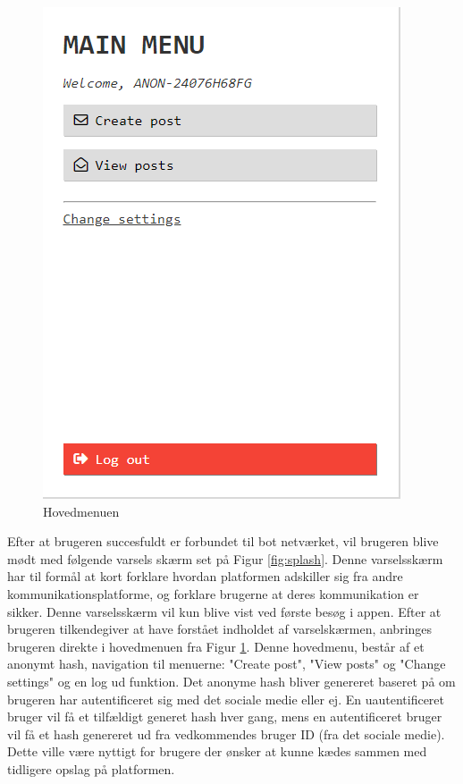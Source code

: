 \begin{table}[H]
\begin{minipage}{.5\textwidth}
\begin{figure}[H]
            \includegraphics[width=0.90\linewidth]{Projectdoc/Assets/Illustrationer/main-menu.png}
            \caption{Hovedmenuen}
            \label{fig:mainmenu}
        \end{figure}
    \end{minipage}
\end{table}

Efter at brugeren succesfuldt er forbundet til bot netværket, vil brugeren blive mødt med følgende varsels skærm set på Figur \ref{fig:splash}. Denne varselsskærm har til formål at kort forklare hvordan platformen adskiller sig fra andre kommunikationsplatforme, og forklare brugerne at deres kommunikation er sikker. Denne varselsskærm vil kun blive vist ved første besøg i appen. Efter at brugeren tilkendegiver at have forstået indholdet af varselskærmen, anbringes brugeren direkte i hovedmenuen fra Figur \ref{fig:mainmenu}. Denne hovedmenu, består af et anonymt hash, navigation til menuerne: "Create post", "View posts" og "Change settings" og en log ud funktion. Det anonyme hash bliver genereret baseret på om brugeren har autentificeret sig med det sociale medie eller ej. En uautentificeret bruger vil få et tilfældigt generet hash hver gang, mens en autentificeret bruger vil få et hash genereret ud fra vedkommendes bruger ID (fra det sociale medie). Dette ville være nyttigt for brugere der ønsker at kunne kædes sammen med tidligere opslag på platformen.

